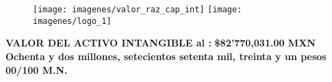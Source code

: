 \begin{center}
\begin{figure}[H]
\centering
	\texttt{[image: imagenes/valor\_raz\_cap\_int]}\hspace{.5cm} \texttt{[image: imagenes/logo\_1]}

\end{figure}

\textcolor{principal}{\textbf{VALOR DEL ACTIVO INTANGIBLE al \fechaValoresCorto:}} \textbf{\$82'770,031.00 MXN} \\


\textcolor{principal}{\textbf{Ochenta y dos millones, setecientos setenta mil, treinta y un pesos 00/100 M.N.}}\\

\end{center}

\vspace{2cm}